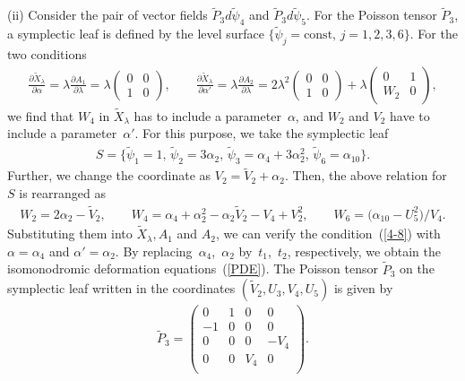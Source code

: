 \documentclass[pdftex]{sigma}
\numberwithin{equation}{section}
\begin{document}
(ii) Consider the pair of vector f\/ields $\widetilde{P}_3 d\widetilde{\psi}_4$ and $\widetilde{P}_3 d\widetilde{\psi}_5$. For the Poisson tensor $\widetilde{P}_3$, a symplectic leaf is def\/ined by the level surface $\{ \widetilde{\psi}_j = \text{const},\, j=1,2,3,6\}$.
For the two conditions
\begin{gather}
\frac{\partial \widetilde{X}_\lambda }{\partial \alpha } = \lambda \frac{\partial A_1 }{\partial \lambda } = \lambda \left(
\begin{matrix}
0 & 0 \\
1 & 0
\end{matrix}
\right), \qquad
\frac{\partial \widetilde{X}_\lambda }{\partial \alpha' } = \lambda \frac{\partial A_2 }{\partial \lambda } = 2\lambda^2 \left(
\begin{matrix}
0 & 0 \\
1 & 0
\end{matrix}
\right) + \lambda \left(
\begin{matrix}
0 & 1 \\
W_2 & 0
\end{matrix}
\right), \label{4-8}
\end{gather}
we f\/ind that $W_4$ in $\widetilde{X}_\lambda $ has to include a parameter~$\alpha $, and $W_2$ and $V_2$ have to include a parame\-ter~$\alpha' $. For this purpose, we take the symplectic leaf
\begin{gather*}
S = \big\{ \widetilde{\psi}_1 = 1,\, \widetilde{\psi}_2 = 3\alpha _2
 ,\, \widetilde{\psi}_3 = \alpha _4 + 3\alpha _2^2,\,
 \widetilde{\psi}_6 = \alpha _{10}\big \}.
\end{gather*}
Further,  we change the coordinate as $V_2 = \widetilde{V}_2 + \alpha _2$. Then, the above relation for $S$ is rearranged as
\begin{gather*}
W_2 = 2 \alpha _2-\widetilde{V}_2,\qquad W_4 = \alpha _4 + \alpha _2^2 - \alpha _2\widetilde{V}_2 - V_4 + V_2^2,
\qquad W_6 = \big(\alpha _{10}- U_5^2\big)/V_4.
\end{gather*}
Substituting them into $\widetilde{X}_\lambda , A_1$ and $A_2$, we can verify the condition~(\ref{4-8}) with $\alpha = \alpha _4$ and $\alpha ' = \alpha _2$. By replacing~$\alpha _4$,~$\alpha _2$ by~$t_1$,~$t_2$, respectively, we obtain the isomonodromic deformation equations~(\ref{PDE}). The Poisson tensor $\widetilde{P}_3$ on the symplectic leaf written in the coordinates $(\widetilde{V}_2, U_3, V_4, U_5)$ is given by
\begin{gather*}
\widetilde{P}_3 = \left(
\begin{matrix}
0 &1 &0 &0 \\
-1&0 &0 &0 \\
0&0 &0 &-V_4 \\
0&0 &V_4 &0 \\
\end{matrix}
\right).
\end{gather*}
\end{document}
